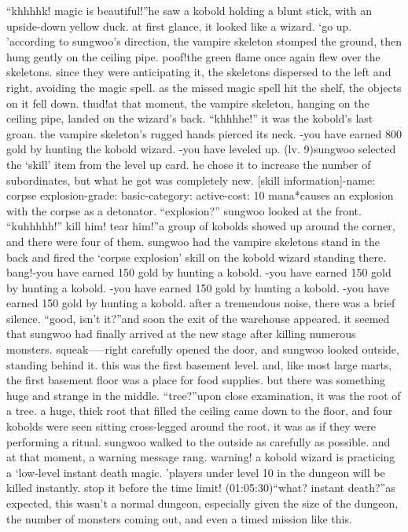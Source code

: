 “khhhhk! magic is beautiful!”he saw a kobold holding a blunt stick, with an upside-down yellow duck.
 at first glance, it looked like a wizard.
‘go up.
’according to sungwoo’s direction, the vampire skeleton stomped the ground, then hung gently on the ceiling pipe.
poof!the green flame once again flew over the skeletons.
 since they were anticipating it, the skeletons dispersed to the left and right, avoiding the magic spell.
 as the missed magic spell hit the shelf, the objects on it fell down.
thud!at that moment, the vampire skeleton, hanging on the ceiling pipe, landed on the wizard’s back.
“khhhhe!” it was the kobold’s last groan.
the vampire skeleton’s rugged hands pierced its neck.
-you have earned 800 gold by hunting the kobold wizard.
-you have leveled up.
 (lv.
 9)sungwoo selected the ‘skill’ item from the level up card.
 he chose it to increase the number of subordinates, but what he got was completely new.
[skill information]-name: corpse explosion-grade: basic-category: active-cost: 10 mana*causes an explosion with the corpse as a detonator.
“explosion?” sungwoo looked at the front.
“kuhhhhh!”
kill him! tear him!”a group of kobolds showed up around the corner, and there were four of them.
sungwoo had the vampire skeletons stand in the back and fired the ‘corpse explosion’ skill on the kobold wizard standing there.
bang!-you have earned 150 gold by hunting a kobold.
-you have earned 150 gold by hunting a kobold.
-you have earned 150 gold by hunting a kobold.
-you have earned 150 gold by hunting a kobold.
after a tremendous noise, there was a brief silence.
“good, isn’t it?”and soon the exit of the warehouse appeared.
 it seemed that sungwoo had finally arrived at the new stage after killing numerous monsters.
squeak—–right carefully opened the door, and sungwoo looked outside, standing behind it.
this was the first basement level.
 and, like most large marts, the first basement floor was a place for food supplies.
 but there was something huge and strange in the middle.
“tree?”upon close examination, it was the root of a tree.
 a huge, thick root that filled the ceiling came down to the floor, and four kobolds were seen sitting cross-legged around the root.
 it was as if they were performing a ritual.
sungwoo walked to the outside as carefully as possible.
and at that moment, a warning message rang.
warning! a kobold wizard is practicing a ‘low-level instant death magic.
’players under level 10 in the dungeon will be killed instantly.
stop it before the time limit! (01:05:30)“what? instant death?”as expected, this wasn’t a normal dungeon, especially given the size of the dungeon, the number of monsters coming out, and even a timed mission like this.
